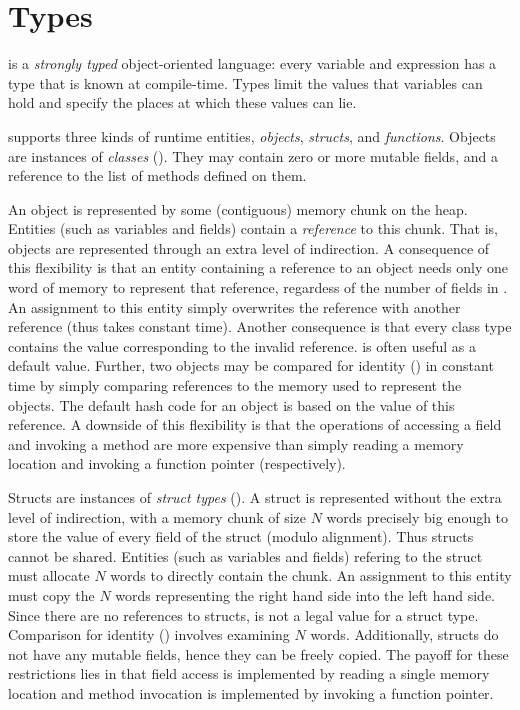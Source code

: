 \chapter{Types}
\label{XtenTypes}

{}\Xten{} is a {\em strongly typed} object-oriented language: every
variable and expression has a type that is known at compile-time.
Types limit the values that variables can hold and specify the places
at which these values can lie.

{}\Xten{} supports three kinds of runtime entities, {\em objects},
{\em structs}, and {\em functions}. Objects are instances of {\em
  classes} (). They may contain zero or
more mutable fields, and a reference to the list of methods defined on them.

An object is represented by some (contiguous) memory chunk on the
heap. Entities (such as variables and fields) contain a {\em
  reference} to this chunk. That is, objects are represented through
an extra level of indirection.  A consequence of this flexibility is
that an entity containing a reference to an object  needs only
one word of memory to represent that reference, regardess of the
number of fields in . An assignment to this entity simply
overwrites the reference with another reference (thus takes constant
time). Another consequence is that every class type contains the value
 corresponding to the invalid reference.  is often
useful as a default value. Further, two objects may be compared for
identity (\Xcd{==}) in constant time by simply comparing references to
the memory used to represent the objects. The default hash code for an
object is based on the value of this reference. A downside of this
flexibility is that the operations of accessing a field and invoking a
method are more expensive than simply reading a memory location and
invoking a function pointer (respectively). 


Structs are instances of {\em struct types} ().  A
struct is represented without the extra level of indirection, with a
memory chunk of size $N$ words precisely big enough to store the value
of every field of the struct (modulo alignment). Thus structs cannot
be shared. Entities (such as variables and fields) refering to the
struct must allocate $N$ words to directly contain the chunk.  An
assignment to this entity must copy the $N$ words representing the
right hand side into the left hand side. Since there are no references
to structs,  is not a legal value for a struct
type. Comparison for identity (\Xcd{==}) involves examining $N$
words. Additionally, structs do not have any mutable fields, hence
they can be freely copied. The payoff for these restrictions lies in
that field access is implemented by reading a single memory location
and method invocation is implemented by invoking a function pointer.

